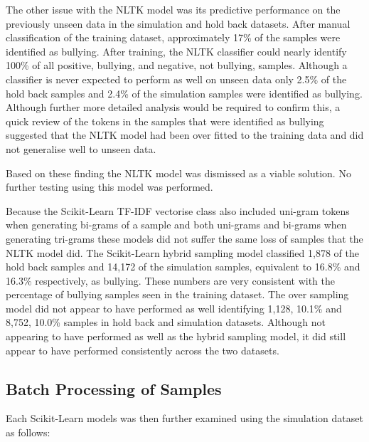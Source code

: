 The other issue with the NLTK model was its predictive performance on the previously unseen data in the simulation and hold back datasets. After manual classification of the training dataset, approximately 17\% of the samples were identified as bullying. After training, the NLTK classifier could nearly identify 100\% of all positive, bullying, and negative, not bullying, samples. Although a classifier is never expected to perform as well on unseen data only 2.5\% of the hold back samples and 2.4\% of the simulation samples were identified as bullying. Although further more detailed analysis would be required to confirm this, a quick review of the tokens in the samples that were identified as bullying suggested that the NLTK model had been over fitted to the training data and did not generalise well to unseen data. 

Based on these finding the NLTK model was dismissed as a viable solution. No further testing using this model was performed.

Because the Scikit-Learn TF-IDF vectorise class also included uni-gram tokens when generating bi-grams of a sample and both uni-grams and bi-grams when generating tri-grams these models did not suffer the same loss of samples that the NLTK model did. The Scikit-Learn hybrid sampling model classified 1,878 of the hold back samples and 14,172 of the simulation samples, equivalent to 16.8\% and 16.3\% respectively, as bullying. These numbers are very consistent with the percentage of bullying samples seen in the training dataset. The over sampling model did not appear to have performed as well identifying 1,128, 10.1\% and 8,752, 10.0\% samples in hold back and simulation datasets. Although not appearing to have performed as well as the hybrid sampling model, it did still appear to have performed consistently across the two datasets.

\subsection{Batch Processing of Samples}

Each Scikit-Learn models was then further examined using the simulation dataset as follows:

